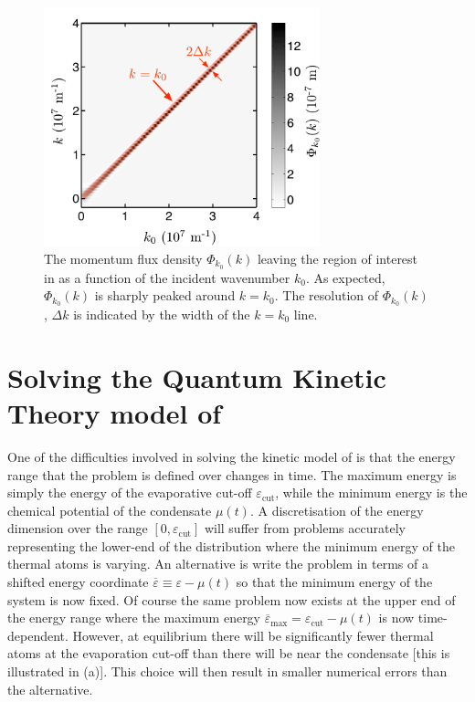 \begin{figure}
    \centering
    \includegraphics[width=8cm]{PhiAccuracy}
    \caption{\label{MethodsAppendix:PhiAccuracy} The momentum flux density $\Phi_{k_0}(k)$ leaving the region of interest in  as a function of the incident wavenumber $k_0$. As expected, $\Phi_{k_0}(k)$ is sharply peaked around $k=k_0$. The resolution of $\Phi_{k_0}(k)$, $\Delta k$ is indicated by the width of the $k=k_0$ line.}
\end{figure}

\section[Solving the Quantum Kinetic Theory model]{Solving the Quantum Kinetic Theory model of }
\label{MethodsAppendix:KineticTheory}

One of the difficulties involved in solving the kinetic model of  is that the energy range that the problem is defined over changes in time.  The maximum energy is simply the energy of the evaporative cut-off $\varepsilon_\text{cut}$, while the minimum energy is the chemical potential of the condensate $\mu(t)$.  A discretisation of the energy dimension over the range $[0, \varepsilon_\text{cut}]$ will suffer from problems accurately representing the lower-end of the distribution where the minimum energy of the thermal atoms is varying.  An alternative is write the problem in terms of a shifted energy coordinate $\overline{\varepsilon} \equiv \varepsilon - \mu(t)$ so that the minimum energy of the system is now fixed.  Of course the same problem now exists at the upper end of the energy range where the maximum energy $\overline{\varepsilon}_\text{max} = \varepsilon_\text{cut} - \mu(t)$ is now time-dependent.  However, at equilibrium there will be significantly fewer thermal atoms at the evaporation cut-off than there will be near the condensate [this is illustrated in (a)].  This choice will then result in smaller numerical errors than the alternative.

